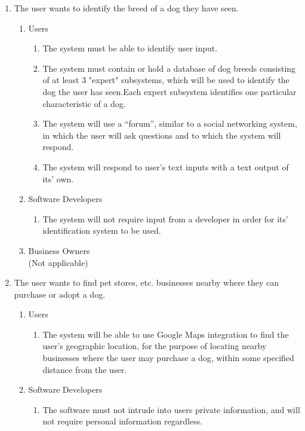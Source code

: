 \documentclass[]{article}
\begin{document}
\begin{enumerate}[{BE}1.]
	\item The user wants to identify the breed of a dog they have seen.
	\begin{enumerate}[{VP1}.1]
		\item Users
		\begin{enumerate}
			\item The system must be able to identify user input.
			\item The system must contain or hold a database of dog breeds consisting of at least 3 "expert" subsystems, which will be used to identify the dog the user has seen.Each expert subsystem identifies one particular characteristic of a dog.
			\item The system will use a “forum”, similar to a social networking system, in which the user will ask questions and to which the system will respond.
			\item The system will respond to user’s text inputs with a text output of its’ own.
		\end{enumerate}
		\item Software Developers
		\begin{enumerate}
			\item The system will not require input from a developer in order for its’ identification system to be used.
		\end{enumerate}
		\item Business Owners\\(Not applicable)
	\end{enumerate}
	\item The user wants to find pet stores, etc. businesses nearby where they can purchase or adopt a dog.
	\begin{enumerate}[{VP2}.1]
		\item Users
		\begin{enumerate}
			\item The system will be able to use Google Maps integration to find the user’s geographic location, for the purpose of locating nearby businesses where the user may purchase a dog, within some specified distance from the user.
		\end{enumerate}
		\item Software Developers
		\begin{enumerate}
			\item The software must not intrude into users private information, and will not require personal information regardless.
		\end{enumerate}

\end{enumerate}
\end{enumerate}
\end{document}
